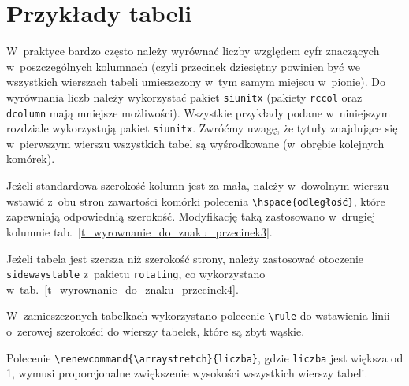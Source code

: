 \section{Przykłady tabeli}
W~praktyce bardzo często należy wyrównać liczby względem cyfr znaczących w~poszczególnych kolumnach (czyli przecinek dziesiętny powinien być we wszystkich wierszach tabeli umieszczony w~tym samym miejscu w~pionie). Do wyrównania liczb należy wykorzystać pakiet \verb+siunitx+ (pakiety \verb+rccol+ oraz \verb+dcolumn+ mają mniejsze możliwości). Wszystkie przykłady podane w~niniejszym rozdziale wykorzystują pakiet \verb+siunitx+. Zwróćmy uwagę, że tytuły znajdujące się w~pierwszym wierszu wszystkich tabel są wyśrodkowane (w~obrębie kolejnych komórek).

Jeżeli standardowa szerokość kolumn jest za mała, należy w~dowolnym wierszu wstawić z~obu stron zawartości komórki polecenia \verb+\hspace{odległość}+, które zapewniają odpowiednią szerokość. Modyfikację taką zastosowano w~drugiej kolumnie tab.~\ref{t_wyrownanie_do_znaku_przecinek3}.

Jeżeli tabela jest szersza niż szerokość strony, należy zastosować otoczenie \verb+sidewaystable+ z~pakietu \verb+rotating+, co wykorzystano w~tab.~\ref{t_wyrownanie_do_znaku_przecinek4}.

W~zamieszczonych tabelkach wykorzystano polecenie \verb+\rule+ do wstawienia linii o~zerowej szerokości do wierszy tabelek, które są zbyt wąskie.

Polecenie \verb|\renewcommand{\arraystretch}{liczba}|, gdzie \verb|liczba| jest większa od 1, wymusi proporcjonalne zwiększenie wysokości wszystkich wierszy tabeli.

